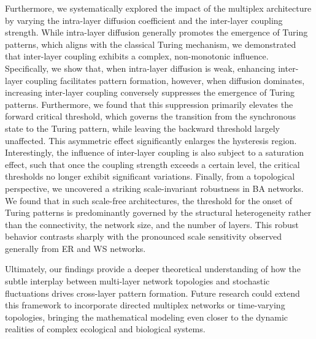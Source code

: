 \documentclass{SCIS2026}
\begin{document}
Furthermore, we systematically explored the impact of the multiplex architecture by varying the intra-layer diffusion coefficient and the inter-layer coupling strength.
While intra-layer diffusion generally promotes the emergence of Turing patterns, which aligns with the classical Turing mechanism, we demonstrated that inter-layer coupling exhibits a complex, non-monotonic influence.
Specifically, we show that, when intra-layer diffusion is weak, enhancing inter-layer coupling facilitates pattern formation, however, when diffusion dominates, increasing inter-layer coupling conversely suppresses the emergence of Turing patterns.
Furthermore,  we found that this suppression primarily elevates the forward critical threshold, which governs the transition from the synchronous state to the Turing pattern, while leaving the backward threshold largely unaffected.
This asymmetric effect significantly enlarges the hysteresis region.
Interestingly, the influence of inter-layer coupling is also subject to a saturation effect, such that once the coupling strength exceeds a certain level, the critical thresholds no longer exhibit significant variations.
Finally, from a topological perspective, we uncovered a striking scale-invariant robustness in BA networks.
We found that in such scale-free architectures, the threshold for the onset of Turing patterns is predominantly governed by the structural heterogeneity rather than the connectivity, the network size, and the number of layers.
This robust behavior contrasts sharply with the pronounced scale sensitivity observed generally from ER and WS networks.

Ultimately, our findings provide a deeper theoretical understanding of how the subtle interplay between multi-layer network topologies and stochastic fluctuations drives cross-layer pattern formation.
Future research could extend this framework to incorporate directed multiplex networks or time-varying topologies, bringing the mathematical modeling even closer to the dynamic realities of complex ecological and biological systems.

\end{document}
